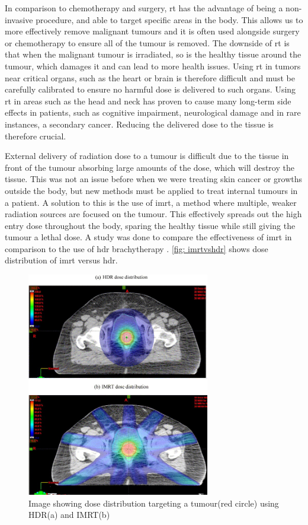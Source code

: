 \documentclass[main.tex]{subfiles}
\begin{document}
 In comparison to chemotherapy and surgery, \gls{rt} has the advantage of being a non-invasive procedure, and able to target specific areas in the body. This allows us to more effectively remove malignant tumours and it is often used alongside surgery or chemotherapy to ensure all of the tumour is removed. The downside of \gls{rt} is that when the malignant tumour is irradiated, so is the healthy tissue around the tumour, which damages it and can lead to more health issues. Using \gls{rt} in tumors near critical organs, such as the heart or brain is therefore difficult and must be carefully calibrated to ensure no harmful dose is delivered to such organs. Using \gls{rt} in areas such as the head and neck has proven to cause many long-term side effects in patients, such as cognitive impairment, neurological damage and in rare instances, a secondary cancer\cite{headRTData}. Reducing the delivered dose to the tissue is therefore crucial.
 
 External delivery of radiation dose to a tumour is difficult due to the tissue in front of the tumour absorbing large amounts of the dose, which will destroy the tissue. This was not an issue before when we were treating skin cancer or growths outside the body, but new methods must be applied to treat internal tumours in a patient. A solution to this is the use of \gls{imrt}, a method where multiple, weaker radiation sources are focused on the tumour. This effectively spreads out the high entry dose throughout the body, sparing the healthy tissue while still giving the tumour a lethal dose. A study was done to compare the effectiveness of \gls{imrt} in comparison to the use of \gls{hdr} brachytherapy \cite{imrtVShdr}. \autoref{fig: imrtvshdr} shows dose distribution of \gls{imrt} versus \gls{hdr}.

 \begin{figure}[!htpb]
    \centering
    \includegraphics[width=8cm ]{images/imrt vs hdr.jpg}
    \caption{Image showing dose distribution targeting a tumour(red circle) using HDR(a) and IMRT(b)\cite{imrtVShdr}}
    \label{fig: imrtvshdr}
\end{figure}
\FloatBarrier 
\end{document}
